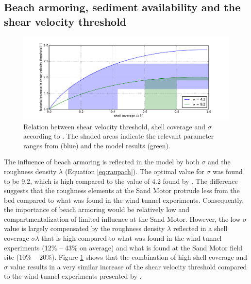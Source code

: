 \documentclass[preprint,12pt,authoryear]{elsarticle}
\begin{document}
\subsection{Beach armoring, sediment availability and the shear
  velocity threshold}

\begin{figure}
  \centering
\includegraphics[width=\columnwidth]{../Figures/sigma}
\caption{Relation between shear velocity threshold, shell coverage and
  $\sigma$ according to \citet[][Equation
  \ref{eq:raupach}]{Raupach1993}. The shaded areas indicate the
  relevant parameter ranges from \citet{McKennaNeuman2012} (blue) and
  the model results (green).}
  \label{fig:sigma}
\end{figure}

The influence of beach armoring is reflected in the model by both
$\sigma$ and the roughness density $\lambda$ (Equation
\ref{eq:raupach}). The optimal value for $\sigma$ was found to be 9.2,
which is high compared to the value of 4.2 found by
\citet{McKennaNeuman2012}. The difference suggests that the roughness
elements at the Sand Motor protrude less from the bed compared to what
was found in the wind tunnel experiments. Consequently, the importance
of beach armoring would be relatively low and compartmentalization of
limited influence at the Sand Motor. However, the low $\sigma$ value
is largely compensated by the roughness density $\lambda$ reflected in
a shell coverage $\sigma \lambda$ that is high compared to what was
found in the wind tunnel experiments (12\% -- 43\% on average) and
what is found at the Sand Motor field site (10\% -- 20\%). Figure
\ref{fig:sigma} shows that the combination of high shell coverage and
$\sigma$ value results in a very similar increase of the shear
velocity threshold compared to the wind tunnel experiments presented
by \citet{McKennaNeuman2012}.
\end{document}
